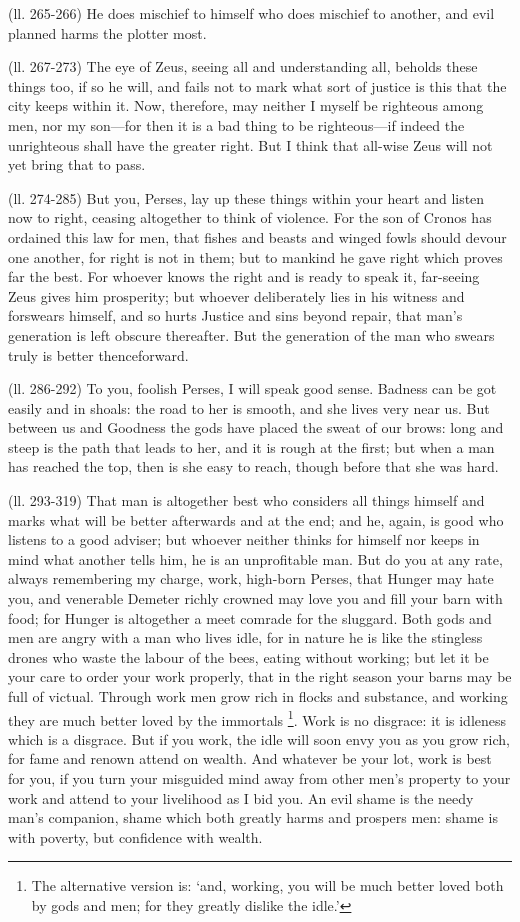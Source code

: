 (ll. 265-266) He does mischief to himself who does mischief to another, and
evil planned harms the plotter most.

(ll. 267-273) The eye of Zeus, seeing all and understanding all, beholds these
things too, if so he will, and fails not to mark what sort of justice is this
that the city keeps within it. Now, therefore, may neither I myself be
righteous among men, nor my son—for then it is a bad thing to be
righteous—if indeed the unrighteous shall have the greater right. But I
think that all-wise Zeus will not yet bring that to pass.

(ll. 274-285) But you, Perses, lay up these things within your heart and listen
now to right, ceasing altogether to think of violence. For the son of Cronos
has ordained this law for men, that fishes and beasts and winged fowls should
devour one another, for right is not in them; but to mankind he gave right
which proves far the best. For whoever knows the right and is ready to speak
it, far-seeing Zeus gives him prosperity; but whoever deliberately lies in his
witness and forswears himself, and so hurts Justice and sins beyond repair,
that man’s generation is left obscure thereafter. But the generation of
the man who swears truly is better thenceforward.

(ll. 286-292) To you, foolish Perses, I will speak good sense. Badness can be
got easily and in shoals: the road to her is smooth, and she lives very near
us. But between us and Goodness the gods have placed the sweat of our brows:
long and steep is the path that leads to her, and it is rough at the first; but
when a man has reached the top, then is she easy to reach, though before that
she was hard.

(ll. 293-319) That man is altogether best who considers all things himself and
marks what will be better afterwards and at the end; and he, again, is good who
listens to a good adviser; but whoever neither thinks for himself nor keeps in
mind what another tells him, he is an unprofitable man. But do you at any rate,
always remembering my charge, work, high-born Perses, that Hunger may hate you,
and venerable Demeter richly crowned may love you and fill your barn with food;
for Hunger is altogether a meet comrade for the sluggard. Both gods and men are
angry with a man who lives idle, for in nature he is like the stingless drones
who waste the labour of the bees, eating without working; but let it be your
care to order your work properly, that in the right season your barns may be
full of victual. Through work men grow rich in flocks and substance, and
working they are much better loved by the immortals \footnote{The alternative version
is: ‘and, working, you will be much better loved both by gods and men;
for they greatly dislike the idle.’}. Work is
no disgrace: it is idleness which is a disgrace. But if you work, the idle will
soon envy you as you grow rich, for fame and renown attend on wealth. And
whatever be your lot, work is best for you, if you turn your misguided mind
away from other men’s property to your work and attend to your livelihood
as I bid you. An evil shame is the needy man’s companion, shame which
both greatly harms and prospers men: shame is with poverty, but confidence with
wealth.


